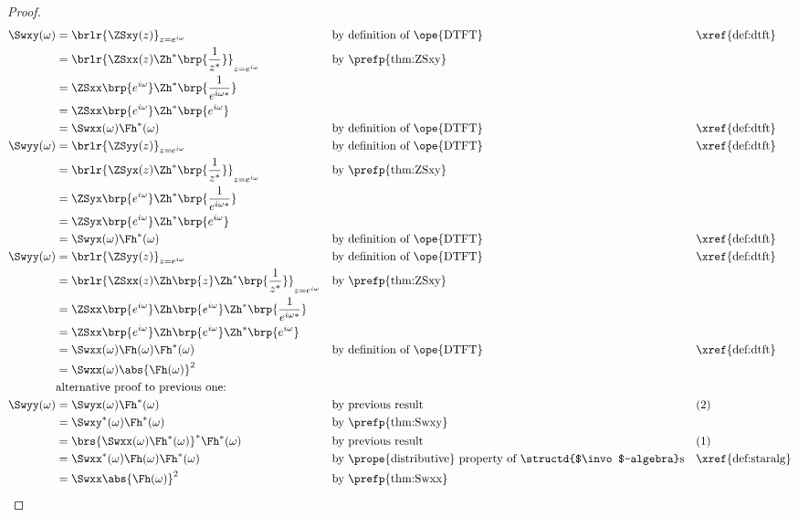 \begin{proof}
\begin{align*}
   \Swxy(\omega)
     &= \brlr{\ZSxy(z)}_{z=e^{i\omega}}
     && \text{by definition of \ope{DTFT}}
     && \text{\xref{def:dtft}}
   \\&= \brlr{\ZSxx(z)\Zh^\ast\brp{\frac{1}{z^\ast}}}_{z=e^{i\omega}}
     && \text{by \prefp{thm:ZSxy}}
   \\&= \ZSxx\brp{e^{i\omega}}\Zh^\ast\brp{\frac{1}{e^{i\omega\ast}}}
   \\&= \ZSxx\brp{e^{i\omega}}\Zh^\ast\brp{e^{i\omega}}
   \\&= \Swxx(\omega) \Fh^\ast(\omega)
     && \text{by definition of \ope{DTFT}}
     && \text{\xref{def:dtft}}
   \\
   \Swyy(\omega)
     &= \brlr{\ZSyy(z)}_{z=e^{i\omega}}
     && \text{by definition of \ope{DTFT}}
     && \text{\xref{def:dtft}}
   \\&= \brlr{\ZSyx(z)\Zh^\ast\brp{\frac{1}{z^\ast}}}_{z=e^{i\omega}}
     && \text{by \prefp{thm:ZSxy}}
   \\&= \ZSyx\brp{e^{i\omega}} \Zh^\ast\brp{\frac{1}{e^{i\omega\ast}}}
   \\&= \ZSyx\brp{e^{i\omega}} \Zh^\ast\brp{e^{i\omega}}
   \\&= \Swyx(\omega) \Fh^\ast(\omega)
     && \text{by definition of \ope{DTFT}}
     && \text{\xref{def:dtft}}
   \\
   \Swyy(\omega)
     &= \brlr{\ZSyy(z)}_{z=e^{i\omega}}
     && \text{by definition of \ope{DTFT}}
     && \text{\xref{def:dtft}}
   \\&= \brlr{\ZSxx(z)\Zh\brp{z} \Zh^\ast\brp{\frac{1}{z^\ast}}}_{z=e^{i\omega}}
     && \text{by \prefp{thm:ZSxy}}
   \\&= \ZSxx\brp{e^{i\omega}} \Zh\brp{e^{i\omega}} \Zh^\ast\brp{\frac{1}{e^{i\omega\ast}}}
   \\&= \ZSxx\brp{e^{i\omega}} \Zh\brp{e^{i\omega}} \Zh^\ast\brp{e^{i\omega}}
   \\&= \Swxx(\omega) \Fh(\omega) \Fh^\ast(\omega)
     && \text{by definition of \ope{DTFT}}
     && \text{\xref{def:dtft}}
   \\&= \Swxx(\omega) \abs{\Fh(\omega)}^2
   \\
     &\text{alternative proof to previous one:}
   \\
   \Swyy(\omega)
     &= \Swyx(\omega) \Fh^\ast(\omega)
     && \text{by previous result}
     && \text{(2)}
   \\&= \Swxy^\ast(\omega) \Fh^\ast(\omega)
     && \text{by \prefp{thm:Swxy}}
   \\&= \brs{\Swxx(\omega) \Fh^\ast(\omega)}^\ast \Fh^\ast(\omega)
     && \text{by previous result}
     && \text{(1)}
   \\&= \Swxx^\ast(\omega) \Fh(\omega) \Fh^\ast(\omega)
     && \text{by \prope{distributive} property of \structd{$\invo$-algebra}s}
     && \text{\xref{def:staralg}}
   \\&= \Swxx \abs{\Fh(\omega)}^2
     && \text{by \prefp{thm:Swxx}}
\end{align*}
\end{proof}
